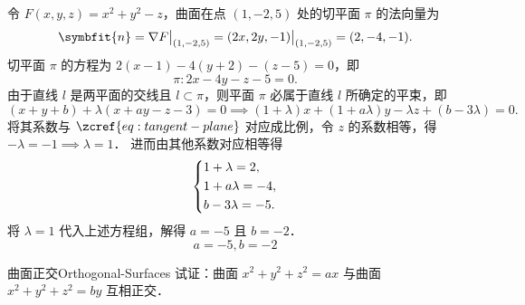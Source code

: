 \begin{solution}
    令 $F(x, y, z) = x^2 + y^2 - z$，曲面在点 $(1, -2, 5)$ 处的切平面 $\pi$ 的法向量为
    \begin{equation}
        \symbfit{n} = \nabla F \big|_{(1, -2, 5)} = (2x, 2y, -1) \big|_{(1, -2, 5)} = (2, -4, -1).
    \end{equation}
    切平面 $\pi$ 的方程为 $2(x - 1) - 4(y + 2) - (z - 5) = 0$，即
    \begin{equation}
        \pi: 2x - 4y - z - 5 = 0. \label{eq:tangent-plane}
    \end{equation}
    由于直线 $l$ 是两平面的交线且 $l \subset \pi$，则平面 $\pi$ 必属于直线 $l$ 所确定的平束，即
    \begin{equation}
        (x + y + b) + \lambda(x + ay - z - 3) = 0 \implies (1 + \lambda)x + (1 + a\lambda)y - \lambda z + (b - 3\lambda) = 0.
    \end{equation}
    将其系数与 $\zcref{eq:tangent-plane}$ 对应成比例，令 $z$ 的系数相等，得 $-\lambda = -1 \implies \lambda = 1$．
    进而由其他系数对应相等得
    \begin{equation}
        \begin{dcases}
            1 + \lambda = 2,   \\
            1 + a\lambda = -4, \\
            b - 3\lambda = -5.
        \end{dcases}
    \end{equation}
    将 $\lambda = 1$ 代入上述方程组，解得 $a = -5$ 且 $b = -2$．
    \begin{equation}
        \boxed{a = -5, b = -2}
    \end{equation}
\end{solution}


\begin{problem}{曲面正交}{Orthogonal-Surfaces}
    试证：曲面 $x^2 + y^2 + z^2 = ax$ 与曲面 $x^2 + y^2 + z^2 = by$ 互相正交．
\end{problem}


